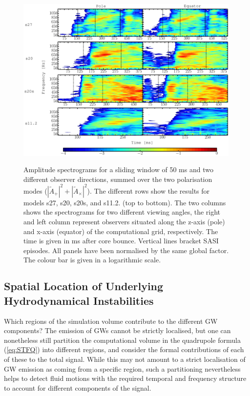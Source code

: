 \begin{figure}
\includegraphics[width=0.99\textwidth]{./images/chp1/fig3.pdf} \\
\caption{Amplitude spectrograms for a sliding window of 50 ms and two different observer
  directions, summed over the two polarisation modes 
  ($|\widetilde{A}_+|^2 + |\widetilde{A}_\times|^2$). The
  different rows show the results for models s27, s20, s20s, and s11.2. (top to bottom).
  The two columns shows the spectrograms for two different viewing angles, the right and left column represent
  observers situated along the z-axis (pole) and x-axis (equator) of the computational grid, respectively.
  The time is given in ms after core bounce. Vertical lines bracket SASI episodes. All panels have been normalised by the same global factor.
  The colour bar is given in a logarithmic scale.
\label{fig:spectrograms}}
\end{figure}

\subsection{Spatial Location of Underlying Hydrodynamical Instabilities} \label{sec:spaceloc}
Which regions of the simulation volume contribute to the different GW
components? The emission of GWs cannot be strictly
localised, but one can nonetheless still partition the computational volume 
in the quadrupole formula (\ref{eq:STFQ}) into different regions,
and consider the formal contributions of each of these to the total
signal. While this may not amount to a strict localisation
of GW emission as coming from  a specific region, such a partitioning
nevertheless helps to detect fluid motions with the required
temporal and frequency structure to account for different components
of the signal.

